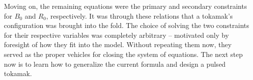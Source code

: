 Moving on, the remaining equations were the primary and secondary constraints for $B_0$ and $R_0$, respectively. It was through these relations that a tokamak's configuration was brought into the fold. The choice of solving the two constraints for their respective variables was completely arbitrary -- motivated only by foresight of how they fit into the model. Without repeating them now, they served as the proper vehicles for closing the system of equations. The next step now is to learn how to generalize the current formula and design a pulsed tokamak.

%
